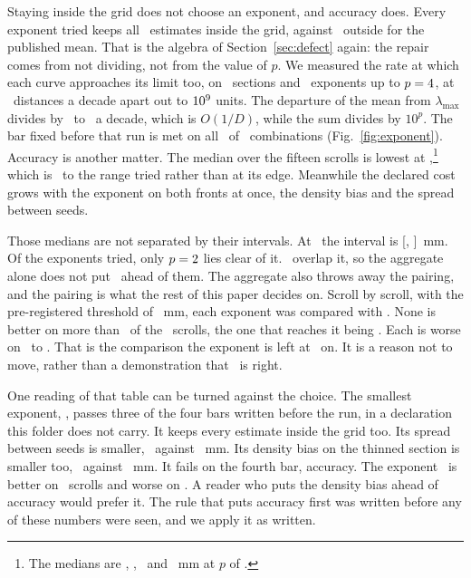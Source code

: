 Staying inside the grid does not choose an exponent, and accuracy does. Every exponent tried keeps all
\RevExpMeanOutsideOf\ estimates inside the grid, against \RevExpMeanOutside\ outside for the
published mean. That is the algebra of Section~\ref{sec:defect} again: the repair comes from not
dividing, not from the value of $p$. We measured the rate at which each curve approaches its limit
too, on \RevExpCancelSections\ sections and \RevExpCancelExponents\ exponents up to
$p=4$, at \RevExpCancelDecades\ distances a decade apart out to $10^9$
units. The departure of the mean from $\lambda_{\max}$ divides by \RevExpCancelRateLow\ to
\RevExpCancelRateHigh\ a decade, which is $O(1/D)$, while the sum divides by $10^p$. The bar fixed
before that run is met on all \RevExpCancelPassed\ of \RevExpCancelCombos\ combinations
(Fig.~\ref{fig:exponent}). Accuracy is another matter. The median over the fifteen scrolls is
lowest at \RevExpLowest,\footnote{The medians are \RevExpPZeroFiveMedian, \RevExpPOneZeroMedian,
\RevExpPOneFiveMedian\ and \RevExpPTwoZeroMedian~mm at $p$ of \RevExpList.} which is
\RevExponentInteriorWord\ to the range tried rather than at its edge. Meanwhile the declared cost
grows with the exponent on both fronts at once, the density bias and the spread between seeds.

Those medians are not separated by their intervals. At \RevExpLowest\ the interval is
[\RevExpCiLo, \RevExpCiHi]~mm. Of the exponents tried, only $p=2$ lies clear of it.
\RevExpCiOverlap\ overlap it, so the aggregate alone does not put \RevExpLowest\ ahead of them. The
aggregate also throws away the pairing, and the pairing is what the rest of this paper decides on.
Scroll by scroll, with the pre-registered threshold of \UmbThresholdMm~mm, each exponent was
compared with \RevExpLowest. None is better on more than \RevExpBetterMax\ of the \RevExpScrolls\
scrolls, the one that reaches it being \RevExpBetterMaxP. Each is worse on \RevExpWorseMin\ to
\RevExpWorseMax. That is the comparison the exponent is left at \RevExpLowest\ on. It is a reason
not to move, rather than a demonstration that \RevExpLowest\ is right.

One reading of that table can be turned against the choice. The smallest exponent, \RevExpLow,
passes three of the four bars written before the run, in a declaration this folder does not
carry. It keeps every estimate inside the grid too. Its spread between seeds is
smaller, \RevExpPZeroFiveSpread\ against \RevExpPOneZeroSpread~mm. Its density bias on the thinned
section is smaller too, \RevExpPZeroFiveBias\ against \RevExpPOneZeroBias~mm. It fails on the
fourth bar, accuracy. The exponent
\RevExpLow\ is better on \RevExpLowBetterOn\ scrolls and worse on \RevExpLowWorseOn. A reader who
puts the density bias ahead of accuracy would prefer it. The rule that puts accuracy first was
written before any of these numbers were seen, and we apply it as written.

